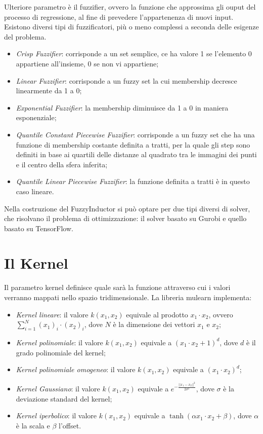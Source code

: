 \documentclass[12pt,a4paper]{report}
\begin{document}
Ulteriore parametro è il fuzzifier, ovvero la funzione che approssima gli ouput del processo di regressione, al fine di prevedere l'appartenenza di nuovi input. Esistono diversi tipi di fuzzificatori, più o meno complessi a seconda delle esigenze del problema.
\begin{itemize}
\item \emph{Crisp Fuzzifier}: corrisponde a un set semplice, ce ha valore 1 se l'elemento 0 appartiene all'insieme, 0 se non vi appartiene;
\item \emph{Linear Fuzzifier}: corrisponde a un fuzzy set la cui membership decresce linearmente da 1 a 0;
\item \emph{Exponential Fuzzifier}: la membership diminuisce da 1 a 0 in maniera esponenziale;
\item \emph{Quantile Constant Piecewise Fuzzifier}:  corrisponde a un fuzzy set che ha una funzione di membership costante definita a tratti, per la quale gli step sono definiti in base ai quartili delle distanze al quadrato tra le immagini dei punti e il centro della sfera inferita; 
\item \emph{Quantile Linear Piecewise Fuzzifier}:  la funzione definita a tratti è in questo caso lineare.
\end{itemize}

Nella costruzione del FuzzyInductor si può optare per due tipi diversi di solver, che risolvano il problema di ottimizzazione: il solver basato su Gurobi e quello basato su TensorFlow. 

\section{Il Kernel}
Il parametro kernel definisce quale sarà la funzione attraverso cui i valori verranno mappati nello spazio tridimensionale.
La libreria mulearn implementa:

\begin{itemize}
\item \emph{Kernel lineare}: il valore $k(x_1,x_2)$ equivale al prodotto $x_1\cdot x_2$, ovvero  $\sum_{i=1}^N(x_1)_i\cdot(x_2)_i$, dove $N$ è la dimensione dei vettori $x_1$ e $x_2$;
\item \emph{Kernel polinomiale}: il valore $k(x_1,x_2)$ equivale a $(x_1\cdot x_2 + 1)^d$, dove $d$ è il grado polinomiale del kernel;
\item \emph{Kernel polinomiale omogeneo}:  il valore  $k(x_1,x_2)$ equivale a $(x_1\cdot x_2)^d$;
\item \emph{Kernel Gaussiano}:   il valore  $k(x_1,x_2)$ equivale a $e^{-\frac{||x_1 - x_2||^2}{2 \sigma^2}}$, dove $\sigma$ è la deviazione standard del kernel;
\item \emph{Kernel iperbolico}:   il valore $k(x_1,x_2)$  equivale a $\tanh(\alpha x_1 \cdot x_2 + \beta)$, dove $\alpha$ è la scala e $\beta$ l'offset.
\end{itemize}
\end{document}
